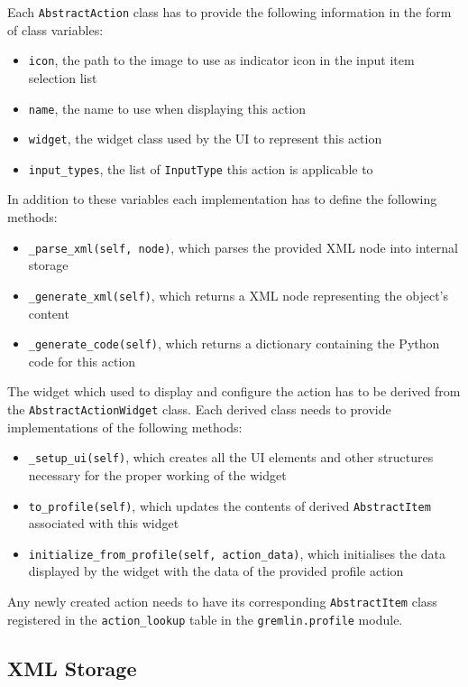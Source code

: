 \documentclass[a4, 10pt]{article}
\begin{document}
Each \verb+AbstractAction+ class has to provide the following information
in the form of class variables:
\begin{itemize}
    \item \verb+icon+, the path to the image to use as indicator icon in
        the input item selection list
    \item \verb+name+, the name to use when displaying this action
    \item \verb+widget+, the widget class used by the UI to represent
        this action
    \item \verb+input_types+, the list of \verb+InputType+ this action
        is applicable to
\end{itemize}
In addition to these variables each implementation has to define the
following methods:
\begin{itemize}
    \item \verb+_parse_xml(self, node)+, which parses the provided XML
        node into internal storage
    \item \verb+_generate_xml(self)+, which returns a XML node
        representing the object's content
    \item \verb+_generate_code(self)+, which returns a dictionary
        containing the Python code for this action
\end{itemize}

The widget which used to display and configure the action has to
be derived from the \verb+AbstractActionWidget+ class. Each derived
class needs to provide implementations of the following methods:
\begin{itemize}
    \item \verb+_setup_ui(self)+, which creates all the UI elements and
        other structures necessary for the proper working of the widget
    \item \verb+to_profile(self)+, which updates the contents of derived
        \verb+AbstractItem+ associated with this widget
    \item \verb+initialize_from_profile(self, action_data)+, which
        initialises the data displayed by the widget with the data of
        the provided profile action
\end{itemize}

Any newly created action needs to have its corresponding
\verb+AbstractItem+ class registered in the \verb+action_lookup+ table
in the \verb+gremlin.profile+ module.


\subsection{XML Storage}
\end{document}
